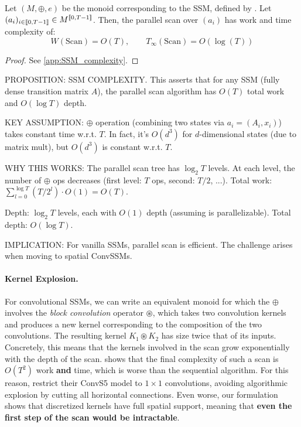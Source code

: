 \documentclass{article}
\begin{document}
\begin{proposition}
\label{prop:SSM_complexity}
    Let $(M, \oplus, e)$ be the monoid corresponding to the SSM, defined by . Let $(a_i)_{i\in \llbracket 0, T-1 \rrbracket}\in M^{\llbracket 0, T-1 \rrbracket}$. Then, the parallel scan over $(a_i)$ has work and time complexity of:
\[
    W(\mathrm{Scan}) = O(T), \qquad T_\infty(\mathrm{Scan}) = O(\log(T))
\]
\end{proposition}

\begin{proof}
See \cref{app:SSM_complexity}.
\end{proof}

\begin{thomasbox}
PROPOSITION: SSM COMPLEXITY. This asserts that for any SSM (fully dense transition matrix $A$), the parallel scan algorithm has $O(T)$ total work and $O(\log T)$ depth.

KEY ASSUMPTION: $\oplus$ operation (combining two states via $a_i = (A_i, x_i)$) takes constant time w.r.t. $T$. In fact, it's $O(d^3)$ for $d$-dimensional states (due to matrix mult), but $O(d^3)$ is constant w.r.t. $T$.

WHY THIS WORKS: The parallel scan tree has $\log_2 T$ levels. At each level, the number of $\oplus$ ops decreases (first level: $T$ ops, second: $T/2$, ...). Total work: $\sum_{l=0}^{\log T} (T/2^l) \cdot O(1) = O(T)$.

Depth: $\log_2 T$ levels, each with $O(1)$ depth (assuming \oplus is parallelizable). Total depth: $O(\log T)$.

IMPLICATION: For vanilla SSMs, parallel scan is efficient. The challenge arises when moving to spatial ConvSSMs.
\end{thomasbox}

\paragraph{Kernel Explosion.} For convolutional SSMs, we can write an equivalent monoid for which the $\oplus$ involves the \emph{block convolution} operator $\circledast$, which takes two convolution kernels and produces a new kernel corresponding to the composition of the two convolutions. The resulting kernel $K_1 \circledast K_2$ has size twice that of its inputs. Concretely, this means that the kernels involved in the scan grow exponentially with the depth of the scan.  shows that the final complexity of such a scan is $O(T^2)$ work \textbf{and} time, which is worse than the sequential algorithm.
%
For this reason, \citet{TODO} restrict their ConvS5 model to $1 \!\times\! 1$ convolutions, avoiding algorithmic explosion by cutting all horizontal connections. Even worse, our formulation shows that discretized kernels have full spatial support, meaning that \textbf{even the first step of the scan would be intractable}.
\end{document}
